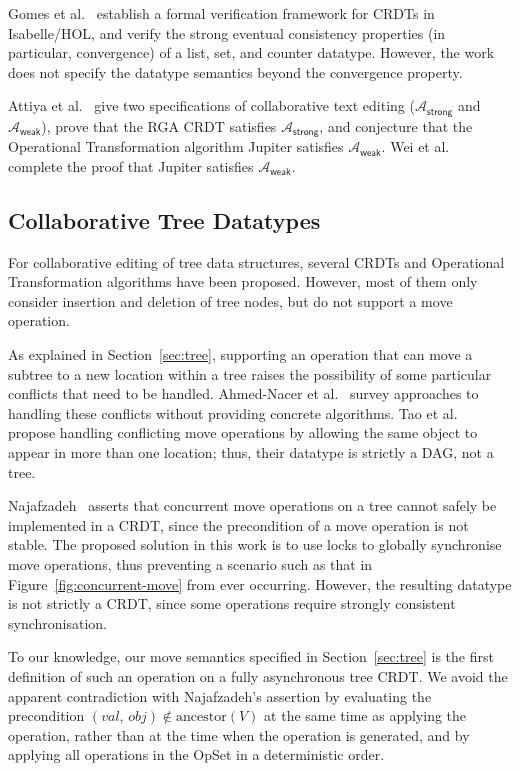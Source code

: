 Gomes et al.~\cite{Gomes:2017gy} establish a formal verification framework for CRDTs in Isabelle/HOL, and verify the strong eventual consistency properties (in particular, convergence) of a list, set, and counter datatype.
However, the work does not specify the datatype semantics beyond the convergence property.

Attiya et al.~\cite{Attiya:2016kh} give two specifications of collaborative text editing ($\mathcal{A}_\textsf{strong}$ and $\mathcal{A}_\textsf{weak}$), prove that the RGA CRDT \cite{Roh:2011dw} satisfies $\mathcal{A}_\textsf{strong}$, and conjecture that the Operational Transformation algorithm Jupiter \cite{Nichols:1995fd} satisfies $\mathcal{A}_\textsf{weak}$.
Wei et al.~\cite{Wei:2017tg} complete the proof that Jupiter satisfies $\mathcal{A}_\textsf{weak}$.

\subsection{Collaborative Tree Datatypes}

For collaborative editing of tree data structures, several CRDTs \cite{Martin:2010ih,Kleppmann:2016ve} and Operational Transformation algorithms \cite{Jungnickel:2016cb,Ignat:2003jy,Davis:2002iv} have been proposed.
However, most of them only consider insertion and deletion of tree nodes, but do not support a move operation.

As explained in Section~\ref{sec:tree}, supporting an operation that can move a subtree to a new location within a tree raises the possibility of some particular conflicts that need to be handled.
Ahmed-Nacer et al.~\cite{AhmedNacer:2012us} survey approaches to handling these conflicts without providing concrete algorithms.
Tao et al.~\cite{Tao:2015gd} propose handling conflicting move operations by allowing the same object to appear in more than one location; thus, their datatype is strictly a DAG, not a tree.

Najafzadeh~\cite{Najafzadeh:2017vk} asserts that concurrent move operations on a tree cannot safely be implemented in a CRDT, since the precondition of a move operation is not stable.
The proposed solution in this work is to use locks to globally synchronise move operations, thus preventing a scenario such as that in Figure~\ref{fig:concurrent-move} from ever occurring.
However, the resulting datatype is not strictly a CRDT, since some operations require strongly consistent synchronisation.

To our knowledge, our move semantics specified in Section~\ref{sec:tree} is the first definition of such an operation on a fully asynchronous tree CRDT.
We avoid the apparent contradiction with Najafzadeh's assertion by evaluating the precondition $(\mathit{val},\, \mathit{obj}) \notin \mathrm{ancestor}(V)$ at the same time as applying the operation, rather than at the time when the operation is generated, and by applying all operations in the OpSet in a deterministic order.

